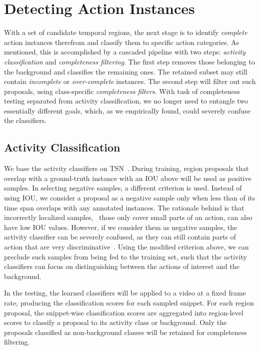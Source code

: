 \documentclass[10pt,twocolumn,letterpaper]{article}
\begin{document}
\section{Detecting Action Instances}
\label{sec:detector}

With a set of candidate temporal regions, 
the next stage is to identify \emph{complete} action instances therefrom and 
classify them to specific action categories.
As mentioned, this is accomplished by a cascaded pipeline with two steps:
\emph{activity classification} and \emph{completeness filtering}.
The first step removes those belonging to the background and 
classifies the remaining ones. 
The retained subset may still contain \emph{incomplete} or
\emph{over-complete} instances.
The second step will filter out such proposals, using 
class-specific \emph{completeness filters}. 
With task of completeness testing separated from 
activity classification, we no longer need to entangle two essentially different goals,
which, as we empirically found, could severely confuse the classifiers.


\subsection{Activity Classification}
\label{sec:detector/cls}

We base the activity classifiers on TSN~\cite{Wang2016TSN}.
During training, region proposals that overlap with a ground-truth instance
with an IOU above  will be used as positive samples. 
In selecting negative samples, a different criterion is used.
Instead of using IOU, we consider a proposal as a negative sample
only when less than  of its time span overlaps with any annotated instances.
The rationale behind is that incorrectly localized samples, \eg~those only cover
small parts of an action, can also have low IOU values. 
However, if we consider them as negative samples, the activity classifier
can be severely confused, as they can still contain parts of action that are very discriminative~\cite{Schindler2008Snippet}.
Using the modified criterion above, we can preclude such samples
from being fed to the training set, such that
the activity classifiers can focus on distinguishing between the actions of interest
and the background. 

In the testing, the learned classifiers will be applied to a video at a fixed frame rate, producing the classification scores for each sampled snippet. 
For each region proposal, the snippet-wise classification scores are aggregated into
region-level scores to classify a proposal to its activity class or background.
Only the proposals classified as non-background classes will be retained for completeness filtering.
\end{document}
